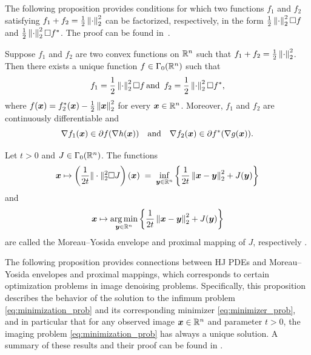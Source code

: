 %
The following proposition provides conditions for which two functions $f_1$ and $f_2$ satisfying $f_1 + f_2 = \frac{1}{2}\left\Vert{\cdot} \right\Vert_{2}^{2}$ can be factorized, respectively, in the form $\frac{1}{2}\left\Vert{\cdot} \right\Vert_{2}^{2}\Box f$ and $\frac{1}{2}\left\Vert{\cdot} \right\Vert_{2}^{2}\Box f^*$. The proof can be found in~\cite{hiriart1989moreau}.
\begin{prop} \label{prop:deconvolutions}
Suppose $f_1$ and $f_2$ are two convex functions on $\mathbb{R}^n$ such that $f_1 + f_2 = \frac{1}{2}\left\Vert{\cdot} \right\Vert_{2}^{2}$. Then there exists a unique function $f \in \Gamma_0(\mathbb{R}^n)$ such that
\[
f_1 = \frac{1}{2}\left\Vert{\cdot} \right\Vert_{2}^{2}\Box f\, \mbox{and }\, f_2 = \frac{1}{2}\left\Vert{\cdot} \right\Vert_{2}^{2}\Box f^*,
\]
where $f(\boldsymbol{x}) = f_2^*(\boldsymbol{x}) - \frac{1}{2}\left\Vert{\boldsymbol{x}} \right\Vert_{2}^{2}$ for every $\boldsymbol{x} \in \mathbb{R}^n$. Moreover, $f_1$ and $f_2$ are continuously differentiable and
\[
\nabla f_1(\boldsymbol{x})\in\partial f(\nabla h(\boldsymbol{x}))\quad\mbox{and}\quad\nabla f_2(\boldsymbol{x})\in\partial f^{*}(\nabla g(\boldsymbol{x})).
\]
\end{prop}
%
\begin{defn}\label{def:moreau_yosida}
Let $t > 0$ and $J \in \Gamma_0(\mathbb{R}^n)$. The functions
\begin{equation}
\boldsymbol{x}\mapsto \left(\frac{1}{2t}\|\cdot\|_2^2 \Box J\right)(\boldsymbol{x}) \;=\;  \inf_{\boldsymbol{y}\in\mathbb{R}^n}\left\{ \frac{1}{2t}\left\Vert{\boldsymbol{x}-\boldsymbol{y}} \right\Vert_{2}^{2}+J(\boldsymbol{y})\right\} 
\end{equation}
and
\begin{equation}
\boldsymbol{x}\mapsto \operatorname*{arg\,min}_{\boldsymbol{y}\in\mathbb{R}^n}\left\{ \frac{1}{2t}\left\Vert{\boldsymbol{x}-\boldsymbol{y}} \right\Vert_{2}^{2}+J(\boldsymbol{y})\right\}
\end{equation}
are called the Moreau--Yosida envelope and proximal mapping of $J$, respectively \cite{hiriart2013convexII,moreau1965proximite,rockafellar2009variational}.
\end{defn}
%
The following proposition provides connections between HJ PDEs and Moreau--Yosida envelopes and proximal mappings, which corresponds to certain optimization problems in image denoising problems. Specifically, this proposition describes the behavior of the solution to the infimum problem \eqref{eq:minimization_prob} and its corresponding minimizer \eqref{eq:minimizer_prob}, and in particular that for any observed image $\boldsymbol{x}\in\mathbb{R}^n$ and parameter $t>0$, the imaging problem \eqref{eq:minimization_prob} has always a unique solution. A summary of these results and their proof can be found in \cite{darbon2015convex}.
